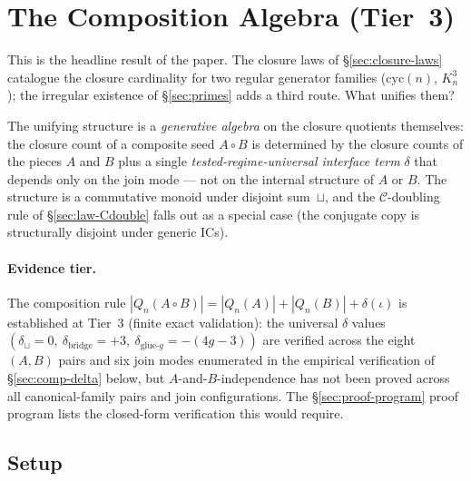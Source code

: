 \documentclass[12pt,a4paper]{article}
\theoremstyle{definition}
\theoremstyle{remark}
\newcommand{\Kn}{K_n^3}
\newcommand{\Qn}{Q_n}
\newcommand{\Ccls}{\mathcal{C}}             %
\newcommand{\cyc}{\mathrm{cyc}}
\begin{document}
\section{The Composition Algebra (Tier~3)}\label{sec:composition}

This is the headline result of the paper. The closure laws of
\S\ref{sec:closure-laws} catalogue the closure cardinality for two
regular generator families ($\cyc(n)$, $\Kn$); the irregular existence
of \S\ref{sec:primes} adds a third route. What unifies them?

The unifying structure is a \emph{generative algebra} on the closure
quotients themselves: the closure count of a composite seed
$A \circ B$ is determined by the closure counts of the pieces $A$
and $B$ plus a single \emph{tested-regime-universal interface term}
$\delta$ that depends only on the join mode --- not on the internal
structure of $A$ or $B$. The structure is a commutative monoid under
disjoint sum~$\sqcup$, and the $\Ccls$-doubling rule of
\S\ref{sec:law-Cdouble} falls out as a special case (the conjugate
copy is structurally disjoint under generic ICs).

\paragraph{Evidence tier.} The composition rule $|\Qn(A \circ B)| =
|\Qn(A)| + |\Qn(B)| + \delta(\iota)$ is established at Tier~3 (finite
exact validation): the universal $\delta$ values $(\delta_\sqcup = 0,\
\delta_{\mathrm{bridge}} = +3,\ \delta_{\mathrm{glue}\text{-}g} =
-(4g - 3))$ are verified across the eight $(A, B)$ pairs and six join
modes enumerated in the empirical verification of
\S\ref{sec:comp-delta} below, but
$A$-and-$B$-independence has not been proved across all
canonical-family pairs and join configurations. The
\S\ref{sec:proof-program} proof program lists the closed-form
verification this would require.

\subsection{Setup}\label{sec:comp-setup}
\end{document}
